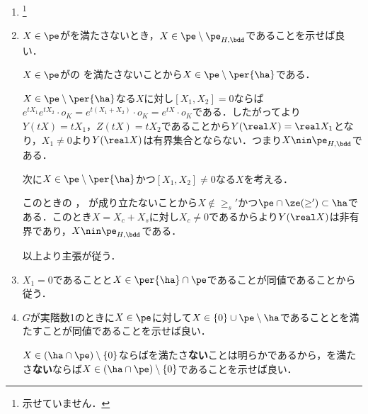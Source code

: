\begin{npfwn}
  \leavevmode\vspace{-1em}
  \begin{enumerate}[label=\textbf{\arabic*.}]
  \item {}\footnote{示せていません．}
    
  \item $X\in \pe$がを満たさないとき，$X\in \pe\setminus\pe_{H,\bdd} $であることを示せば良い．
    
    $X\in \pe$がの  を満たさないことから$X\in\pe\setminus\per{\ha} $である．

    $X\in \pe\setminus\per{\ha} $なる$X$に対し$[X_1,X_2] = 0$ならば$e^{tX_1}e^{tX_2}\cdot o_K = e^{t(X_1 + X_2)}\cdot o_K = e^{tX}\cdot o_K$である．したがってより$Y(tX) = tX_1 $，$Z(tX) = tX_2 $であることから$Y(\real X) = \real X_1 $となり，$X_1\neq 0$より$Y(\real X)$は有界集合とならない．つまり$X\nin\pe_{H,\bdd} $である．

    次に$X\in \pe\setminus \per{\ha} $かつ$[X_1,X_2] \neq 0$なる$X$を考える．

    このときの ， が成り立たないことから$X\nin \ge_{s}' $かつ$\pe\cap \ze(\ge')\subset \ha $である．このとき$X = X_c + X_s $に対し$X_c\neq 0$であるからより$Y(\real X)$は非有界であり，$X\nin\pe_{H,\bdd} $である．


    以上より主張が従う．
  \item $X_1 = 0$であることと$ X\in \per{\ha}\cap\pe $であることが同値であることから従う．
  \item $G$が実階数1のときに$X\in \pe$に対して$X\in \{0\}\cup \pe\setminus \ha $であることとを満たすことが同値であることを示せば良い．

    $X\in(\ha\cap\pe)\setminus\{0\} $ならばを満たさ\textbf{ない}ことは明らかであるから，を満たさ\textbf{ない}ならば$X\in(\ha\cap\pe)\setminus\{0\} $であることを示せば良い．


\end{enumerate}
\end{npfwn}
